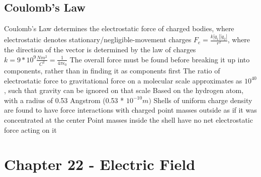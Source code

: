 \documentclass[11 pt, twoside]{article}
\newenvironment{outline*}
{
	\begin{outline}[enumerate]
	}
	{\end{outline}
}
\begin{document}
\subsection{Coulomb's Law}
\begin{outline*}
\1 Coulomb's Law determines the electrostatic force of charged bodies, where electrostatic denotes stationary/negligible-movement charges
\1 $F_e = \frac{k|q_1||q_2|}{r^2}$, where the direction of the vector is determined by the law of charges
\2 $k = 9 * 10^9 \frac{Nm^2}{C^2} = \frac{1}{4\pi\epsilon_0}$
\2 The overall force must be found before breaking it up into components, rather than in finding it as components first
\1 The ratio of electrostatic force to gravitational force on a molecular scale approximates as $10^{40}$, such that gravity can be ignored on that scale
\2 Based on the hydrogen atom, with a radius of 0.53 Angstrom (0.53 * $10^{-10} m)$
\1 Shells of uniform charge density are found to have force interactions with charged point masses outside as if it was concentrated at the center
\2 Point masses inside the shell have no net electrostatic force acting on it
\end{outline*}

\section{Chapter 22 - Electric Field}
\end{document}

